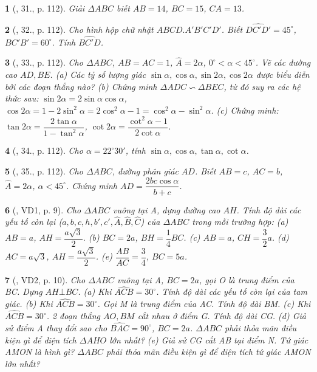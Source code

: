 \documentclass{article}
\newtheorem{baitoan}{}
\begin{document}
\begin{baitoan}[\cite{Tuyen_Toan_9_old}, 31., p. 112]
	Giải $\Delta ABC$ biết $AB = 14$, $BC = 15$, $CA = 13$.
\end{baitoan}

\begin{baitoan}[\cite{Tuyen_Toan_9_old}, 32., p. 112]
	Cho hình hộp chữ nhật $ABCD.A'B'C'D'$. Biết $\widehat{DC'D'} = 45^\circ$, $\widehat{BC'B'} = 60^\circ$. Tính $\widehat{BC'D}$.
\end{baitoan}

\begin{baitoan}[\cite{Tuyen_Toan_9_old}, 33., p. 112]
	Cho $\Delta ABC$, $AB = AC = 1$, $\widehat{A} = 2\alpha$, $0^\circ < \alpha < 45^\circ$. Vẽ các đường cao $AD,BE$. (a) Các tỷ số lượng giác $\sin\alpha,\cos\alpha,\sin2\alpha,\cos2\alpha$ được biểu diễn bởi các đoạn thẳng nào? (b) Chứng minh $\Delta ADC\backsim\Delta BEC$, từ đó suy ra các hệ thức sau: $\sin2\alpha = 2\sin\alpha\cos\alpha$, $\cos2\alpha = 1 - 2\sin^2\alpha = 2\cos^2\alpha - 1 = \cos^2\alpha - \sin^2\alpha$. (c) Chứng minh: $\tan2\alpha = \dfrac{2\tan\alpha}{1 - \tan^2\alpha}$, $\cot2\alpha = \dfrac{\cot^2\alpha - 1}{2\cot\alpha}$.
\end{baitoan}

\begin{baitoan}[\cite{Tuyen_Toan_9_old}, 34., p. 112]
	Cho $\alpha = 22^\circ30'$, tính $\sin\alpha,\cos\alpha,\tan\alpha,\cot\alpha$.
\end{baitoan}

\begin{baitoan}[\cite{Tuyen_Toan_9_old}, 35., p. 112]
	Cho $\Delta ABC$, đường phân giác $AD$. Biết $AB = c$, $AC = b$, $\widehat{A} = 2\alpha$, $\alpha < 45^\circ$. Chứng minh $AD = \dfrac{2bc\cos\alpha}{b + c}$.
\end{baitoan}

\begin{baitoan}[\cite{Kien_hinh_hoc_9}, VD1, p. 9]
	Cho $\Delta ABC$ vuông tại A, dựng đường cao $AH$. Tính độ dài các yếu tố còn lại ($a,b,c,h,b',c',\widehat{A},\widehat{B},\widehat{C}$) của $\Delta ABC$ trong mỗi trường hợp: (a) $AB = a$, $AH = \dfrac{a\sqrt{3}}{2}$. (b) $BC = 2a$, $BH = \dfrac{1}{4}BC$. (c) $AB = a$, $CH = \dfrac{3}{2}a$. (d) $AC = a\sqrt{3}$, $AH = \dfrac{a\sqrt{3}}{2}$. (e) $\dfrac{AB}{AC} = \dfrac{3}{4}$, $BC = 5a$.
\end{baitoan}

\begin{baitoan}[\cite{Kien_hinh_hoc_9}, VD2, p. 10]
	Cho $\Delta ABC$ vuông tại A, $BC = 2a$, gọi O là trung điểm của BC. Dựng $AH\bot BC$. (a) Khi $\widehat{ACB} = 30^\circ$. Tính độ dài các yếu tố còn lại của tam giác. (b) Khi $\widehat{ACB} = 30^\circ$. Gọi M là trung điểm của AC. Tính độ dài BM. (c) Khi $\widehat{ACB} = 30^\circ$. 2 đoạn thẳng $AO,BM$ cắt nhau ở điểm G. Tính độ dài CG. (d) Giả sử điểm A thay đổi sao cho $\widehat{BAC} = 90^\circ$, $BC = 2a$. $\Delta ABC$ phải thỏa mãn điều kiện gì để diện tích $\Delta AHO$ lớn nhất? (e) Giả sử CG cắt AB tại điểm N. Tứ giác AMON là hình gì? $\Delta ABC$ phải thỏa mãn điều kiện gì để diện tích tứ giác AMON lớn nhất?
\end{baitoan}
\end{document}
